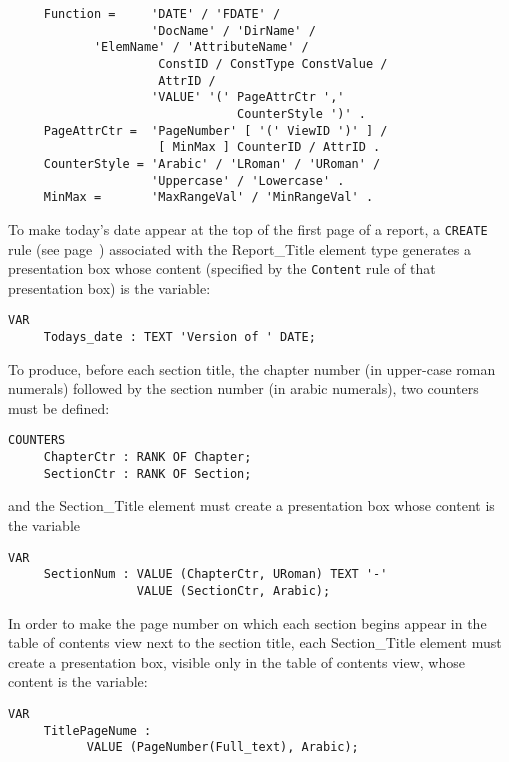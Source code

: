 \begin{verbatim}
     Function =     'DATE' / 'FDATE' /
                    'DocName' / 'DirName' /
		    'ElemName' / 'AttributeName' /
                     ConstID / ConstType ConstValue /
                     AttrID /
                    'VALUE' '(' PageAttrCtr ','
                                CounterStyle ')' .
     PageAttrCtr =  'PageNumber' [ '(' ViewID ')' ] /
                     [ MinMax ] CounterID / AttrID .
     CounterStyle = 'Arabic' / 'LRoman' / 'URoman' /
                    'Uppercase' / 'Lowercase' .
     MinMax =       'MaxRangeVal' / 'MinRangeVal' .
\end{verbatim}

\begin{example}
To make today's date appear at the top of the first page of a report,
a {\tt CREATE} rule (see page~\pageref{creation}) associated with the
Report\_Title element type generates a presentation box whose content
(specified by the {\tt Content} rule of that presentation box) is the variable:
\begin{verbatim}
VAR
     Todays_date : TEXT 'Version of ' DATE;
\end{verbatim}

To produce, before each section title, the chapter number (in
upper-case roman numerals) followed by the section number (in arabic
numerals), two counters must be defined:

\begin{verbatim}
COUNTERS
     ChapterCtr : RANK OF Chapter;
     SectionCtr : RANK OF Section;
\end{verbatim}
and the Section\_Title element must create a presentation box whose
content is the variable
\begin{verbatim}
VAR
     SectionNum : VALUE (ChapterCtr, URoman) TEXT '-'
                  VALUE (SectionCtr, Arabic);
\end{verbatim}

In order to make the page number on which each section begins appear
in the table of contents view next to the section title, each
Section\_Title element must create a presentation box, visible only in
the table of contents view, whose content is the variable:

\begin{verbatim}
VAR
     TitlePageNume :
           VALUE (PageNumber(Full_text), Arabic);
\end{verbatim}
\end{example}

